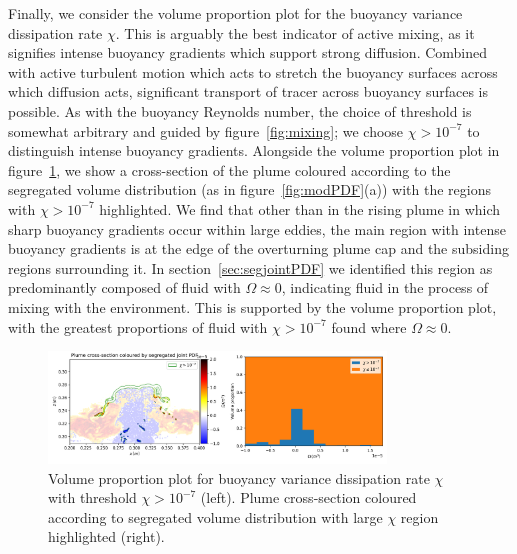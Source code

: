 \documentclass[a4paper]{article}
\begin{document}
Finally, we consider the volume proportion plot for the buoyancy variance dissipation rate $\chi$. This is
arguably the best indicator of active mixing, as it signifies intense buoyancy gradients which support strong
diffusion. Combined with active turbulent motion which acts to stretch the buoyancy surfaces across which
diffusion acts, significant transport of tracer across buoyancy surfaces is possible. As with the buoyancy
Reynolds number, the choice of threshold is somewhat arbitrary and guided by figure~\ref{fig:mixing}; we
choose $\chi > 10^{-7}$ to distinguish intense buoyancy gradients. Alongside the volume proportion plot in
figure~\ref{fig:chi_vol}, we show a cross-section of the plume coloured according to the segregated volume
distribution (as in figure~\ref{fig:modPDF}(a)) with the regions with $\chi > 10^{-7}$ highlighted. We find
that other than in the rising plume in which sharp buoyancy gradients occur within large eddies, the main
region with intense buoyancy gradients is at the edge of the overturning plume cap and the subsiding regions
surrounding it. In section~\ref{sec:segjointPDF} we identified this region as predominantly composed of fluid
with $\Omega \approx 0$, indicating fluid in the process of mixing with the environment. This is supported by
the volume proportion plot, with the greatest proportions of fluid with $\chi > 10^{-7}$ found where $\Omega
\approx 0$.

\begin{figure}
	\centering
	\includegraphics[width=0.8\textwidth]{chi_vol}
	\caption{Volume proportion plot for buoyancy variance dissipation rate $\chi$ with threshold $\chi >
		10^{-7}$ (left). Plume cross-section coloured according to segregated volume distribution with large
		$\chi$ region highlighted (right).}
	\label{fig:chi_vol}
\end{figure}
\end{document}
